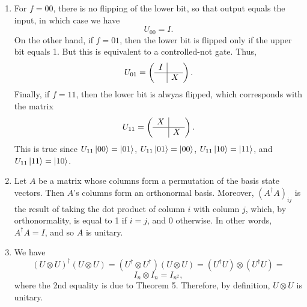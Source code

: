 \documentclass [12pt]{article}
\theoremstyle{definition}
\begin{document}
\begin{enumerate}


\item For $f=00$, there is no flipping of the lower bit, so that output equals the input, in which case we have 
\[U_{00} = I.\]
On the other hand, if $f=01$, then the lower bit is flipped only if the upper bit equals 1. But this is equivalent to a controlled-not gate.
Thus,
\[U_{01} = 
\left(\begin{array}{c|c}
I & \\
\hline
 &  X \\
\end{array}\right).\]
Finally, if $f=11$, then the lower bit is alwyas flipped, which corresponds with the matrix
\[
 U_{11} = 
\left(\begin{array}{c|c}
X & \\
\hline
 &  X \\
\end{array}\right).
\]
This is true since $U_{11}\ket{00} = \ket{01}$, $U_{11}\ket{01} = \ket{00}$, $U_{11}\ket{10} = \ket{11}$, and $U_{11}\ket{11} = \ket{10}$.

\item 
Let $A$ be a matrix whose columns form a permutation of the basis state vectors. Then $A$'s columns form an orthonormal basis. 
Moreover, $(A^{\dagger}A)_{ij}$ is the result of taking the dot product of column $i$ with column $j$, which, by orthonormality, is equal to 1 if $i=j$, and 0 otherwise.
In other words, $A^{\dagger}A= I$, and so $A$ is unitary.



\item We have
\[(U\otimes U)^{\dagger}(U\otimes U) = (U^{\dagger}\otimes U^{\dagger})(U\otimes U) = (U^{\dagger}U)\otimes (U^{\dagger}U) =\]
\[I_{n}\otimes I_n = I_{n^2},\]
where the 2nd equality is due to Theorem 5.
Therefore, by definition, $U\otimes U$ is unitary.



\end{enumerate}
\end{document}
